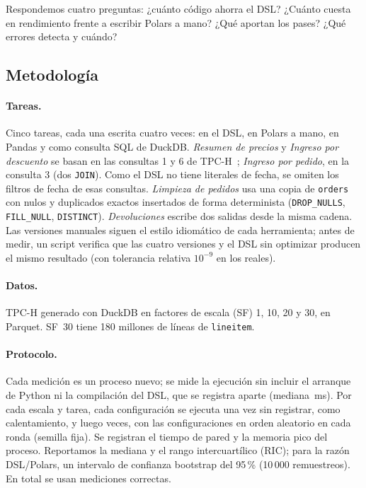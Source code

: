 \documentclass[sigplan,screen,nonacm]{acmart}
\begin{document}
Respondemos cuatro preguntas: ¿cuánto código ahorra el DSL? ¿Cuánto cuesta en rendimiento
frente a escribir Polars a mano? ¿Qué aportan los pases? ¿Qué errores detecta y cuándo?

\subsection{Metodología}

\paragraph{Tareas.} Cinco tareas, cada una escrita cuatro veces: en el DSL, en Polars a
mano, en Pandas y como consulta SQL de DuckDB. \emph{Resumen de precios} y \emph{Ingreso por
descuento} se basan en las consultas 1 y 6 de TPC-H~\cite{tpch}; \emph{Ingreso por pedido},
en la consulta 3 (dos \texttt{JOIN}). Como el DSL no tiene literales de fecha, se omiten los
filtros de fecha de esas consultas. \emph{Limpieza de pedidos} usa una copia de
\texttt{orders} con nulos y duplicados exactos insertados de forma determinista
(\texttt{DROP\_NULLS}, \texttt{FILL\_NULL}, \texttt{DISTINCT}). \emph{Devoluciones} escribe dos
salidas desde la misma cadena. Las versiones manuales siguen el estilo idiomático de cada
herramienta; antes de medir, un script verifica que las cuatro versiones y el DSL sin
optimizar producen el mismo resultado (con tolerancia relativa $10^{-9}$ en los reales).

\paragraph{Datos.} TPC-H generado con DuckDB en factores de escala (SF) 1, 10, 20 y 30, en
Parquet. SF~30 tiene 180 millones de líneas de \texttt{lineitem}.

\paragraph{Protocolo.} Cada medición es un proceso nuevo; se mide la ejecución sin incluir el
arranque de Python ni la compilación del DSL, que se registra aparte (mediana
\compilacionMs{}\,ms). Por cada escala y tarea, cada configuración se ejecuta una vez sin
registrar, como calentamiento, y luego \repeticiones{} veces, con las configuraciones en orden
aleatorio en cada ronda (semilla fija). Se registran el tiempo de pared y la memoria pico del
proceso. Reportamos la mediana y el rango intercuartílico (RIC); para la razón DSL/Polars,
un intervalo de confianza bootstrap del 95\,\% (10\,000 remuestreos). En total se usan
\mediciones{} mediciones correctas.
\end{document}

